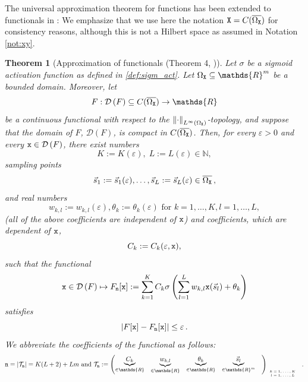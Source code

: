 \documentclass[10pt]{article}
\numberwithin{equation}{section}
\newtheorem{theorem}[theorem]{Theorem}
\theoremstyle{nonumberplain}
\newcommand{\N}{\mathds{N}}
\newcommand{\R}{\mathds{R}}
\newcommand{\dom}[1]{\mathcal{D}\left(#1\right)}
\newcommand{\abs}[1]{\left|#1\right|}
\newcommand{\norm}[1]{\left\|#1\right\|}
\newcommand{\ve}{\varepsilon}
\newcommand{\bs}{\vec{s}}
\newcommand{\X}{{\tt X}}
\newcommand{\n}{{\tt n}}
\newcommand{\x}{{\tt x}}
\begin{document}
The universal approximation theorem for functions has been extended to functionals in \cite{TiaHon95}: We emphasize that we use here the notation $\X=C(\overline{\Omega_\X})$ for consistency reasons, although this is not a Hilbert space as assumed in Notation \autoref{not:xy}.
\begin{theorem}[Approximation of functionals (Theorem 4, \cite{TiaHon95})]\label{th:functional_apx_cont}
	Let $\sigma$ be a sigmoid activation function as defined in \autoref{def:sigm_act}. Let 
	$\Omega_\X \subseteq \R^m$ be a bounded domain.
	Moreover, let 
	\begin{equation*}
		F: \dom{F} \subseteq C(\overline{\Omega_\X}) \to \R
	\end{equation*}
	be a continuous functional with respect to the $\norm{\cdot}_{L^\infty(\Omega_\X)}$-topology, and suppose that the domain of $F$, $\dom{F}$, is compact in $C(\overline{\Omega_\X})$. Then, for every $\ve >0$ and every $\x \in \dom{F}$, there exist numbers
	$$K := K(\ve), \; L := L(\ve) \in \N,$$
	sampling points 
	$$\bs_1 := \bs_1(\ve), \dots, \bs_{L}:=\bs_L(\ve) \in \overline{\Omega_\X}\,,$$ 
	and real numbers
	$$ w_{k,l} := w_{k,l}(\ve), \theta_k := \theta_k(\ve) \text{ for } k=1,\dots, K, l=1,\dots, L,$$ 
	(all of the above coefficients are independent of $\x$)
	and coefficients, which are dependent of $\x$,  
	$$ C_k := C_k(\ve,\x),$$
	such that the functional
	\begin{equation}\label{eq:functional_finite}
		\x \in \dom{F} \mapsto F_\n[\x] :=  \sum_{k=1}^{K} C_k \sigma\left(\sum_{l=1}^{L} w_{k,l}\x(\bs_l) + \theta_k\right)
	\end{equation} 
	satisfies 
	\begin{equation} \label{eq:functional_approx}
		\abs{F[\x]-F_\n[\x]} \leq \ve \,.
	\end{equation}
	We abbreviate the coefficients of the functional as follows:
	\begin{equation*}
		\n = \abs{\mathcal{T}_\n} = K(L+2) + Lm
		\text{ and }
		\mathcal{T}_\n:= \begin{pmatrix}  \underbrace{ C_{k}}_{\in \R} & \underbrace{ w_{k,l}}_{\in \R} & \underbrace{ \theta_k}_{\in \R} & \underbrace{ \bs_l}_{\in \R^m} &\end{pmatrix}_{\tiny \begin{array}{c} k=1,\dots,K\\ l=1,\dots,L\end{array}}\;.
	\end{equation*}
\end{theorem}
\end{document}
